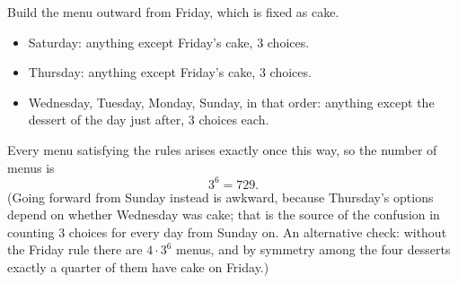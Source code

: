 Build the menu outward from Friday, which is fixed as cake.
\begin{itemize}
\item Saturday: anything except Friday's cake, $3$ choices.
\item Thursday: anything except Friday's cake, $3$ choices.
\item Wednesday, Tuesday, Monday, Sunday, in that order: anything except the dessert of the day just after, $3$ choices each.
\end{itemize}
Every menu satisfying the rules arises exactly once this way, so the number of menus is
\[3^6=\boxed{729}.\]
(Going forward from Sunday instead is awkward, because Thursday's options depend on whether Wednesday was cake; that is the source of the confusion in counting $3$ choices for every day from Sunday on. An alternative check: without the Friday rule there are $4\cdot3^6$ menus, and by symmetry among the four desserts exactly a quarter of them have cake on Friday.)
